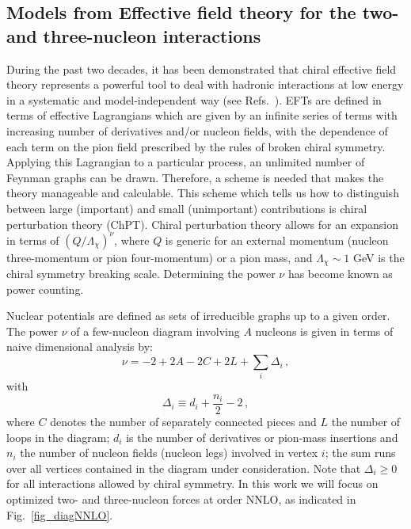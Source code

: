 \subsection{Models from Effective field theory for the two- and three-nucleon interactions}\label{subsec:forcemodels}

During the past two decades, it has been demonstrated that chiral
effective field theory represents a powerful tool to deal with
hadronic interactions at low energy in a systematic and
model-independent way (see
Refs.~\cite{weinberg1990,weinberg1991,ordonez1992,ordonez1994,ordonez1996,vankolck1999,machleidt2011,epelbaum2009,ekstrom2013}).
EFTs are defined in terms of effective Lagrangians which are given by
an infinite series of terms with increasing number of derivatives
and/or nucleon fields, with the dependence of each term on the pion
field prescribed by the rules of broken chiral symmetry.  Applying
this Lagrangian to a particular process, an unlimited number of
Feynman graphs can be drawn. Therefore, a scheme is needed that makes
the theory manageable and calculable.  This scheme which tells us how
to distinguish between large (important) and small (unimportant)
contributions is chiral perturbation theory (ChPT).  Chiral perturbation theory  allows for
an expansion in terms of $(Q/\Lambda_\chi)^\nu$, where $Q$ is generic
for an external momentum (nucleon three-momentum or pion
four-momentum) or a pion mass, and $\Lambda_\chi \sim 1$ GeV is the
chiral symmetry breaking scale.  Determining the power $\nu$ has
become known as power counting.

Nuclear potentials are defined as sets of irreducible graphs up to a
given order.  The power $\nu$ of a few-nucleon diagram involving $A$
nucleons is given in terms of naive dimensional analysis by:
\begin{equation} 
\nu = -2 +2A - 2C + 2L + \sum_i \Delta_i \, ,
\label{eq_nu} 
\end{equation}
with
\begin{equation}
\Delta_i \equiv d_i + \frac{n_i}{2} - 2 \, ,
\label{eq_Deltai}
\end{equation}
where $C$ denotes the number of separately connected pieces and $L$
the number of loops in the diagram; $d_i$ is the number of derivatives
or pion-mass insertions and $n_i$ the number of nucleon fields
(nucleon legs) involved in vertex $i$; the sum runs over all vertices
contained in the diagram under consideration.  Note that $\Delta_i
\geq 0$ for all interactions allowed by chiral symmetry.  In this work
we will focus on optimized two- and three-nucleon forces at order
NNLO, as indicated in Fig.~\ref{fig_diagNNLO}.  

